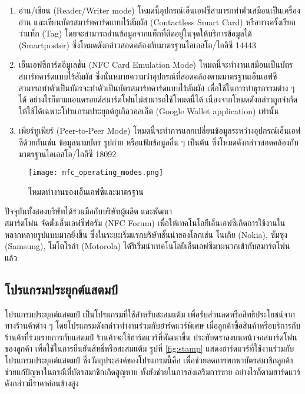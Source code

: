 \documentclass[12pt,a4paper,twocolumn]{article}
\begin{document}
\begin{enumerate}
\item อ่าน/เขียน (Reader/Writer mode) โหมดนี้อุปกรณ์เอ็นเอฟซีสามารถทำตัวเสมือนเป็นเครื่องอ่าน และเขียนบัตรสมาร์ทคาร์ดแบบไร้สัมผัส (Contactless Smart Card) หรือบางครั้งเรียกว่าแท็ก (Tag) โดยจะสามารถอ่านข้อมูลจากแท็กที่ติดอยู่ในจุดให้บริการข้อมูลได้ (Smartposter) ซึ่งโหมดดังกล่าวสอดคล้องกับมาตรฐานไอเอสโอ/ไออีซี 14443

\item เอ็นเอฟซีการ์ดอีมูเลชั่น (NFC Card Emulation Mode) โหมดนี้จะทำงานเสมือนเป็นบัตรสมาร์ทคาร์ดแบบไร้สัมผัส ซึ่งนั่นหมายความว่าอุปกรณ์ที่สอดคล้องตามมาตรฐานเอ็นเอฟซี สามารถทำตัวเป็นบัตรจะทำตัวเป็นบัตรสมาร์ทคาร์ดแบบไร้สัมผัส เพื่อใช้ในการทำธุรกรรมต่าง ๆ ได้ อย่างไรก็ตามแอนดรอยด์สมาร์ตโฟนไม่สามารถใช้โหมดนี้ได้ \cite{itm:IDA-Pay} เนื่องจากโหมดดังกล่าวถูกจำกัดให้ใช้ได้เฉพาะโปรแกรมประยุกต์กูเกิลวอลเล็ต (Google Wallet application) เท่านั้น 

\item เพียร์ทูเพียร์ (Peer-to-Peer Mode) โหมดนี้จะทำการแลกเปลี่ยนข้อมูลระหว่างอุปกรณ์เอ็นเอฟซีด้วยกันเช่น ข้อมูลนามบัตร รูปถ่าย หรือแฟ้มข้อมูลอื่น ๆ เป็นต้น ซึ่งโหมดดังกล่าวสอดคล้องกับมาตรฐานไอเอสโอ/ไออีซี 18092
\end{enumerate}

\begin{figure}[ht!]
\centering
\texttt{[image: nfc\_operating\_modes.png]}
\caption{โหมดทำงานของเอ็นเอฟซีและมาตรฐาน} \label{fig:nfc}
\label{overflow}
\end{figure}

ปัจจุบันทั้งสองบริษัทได้ร่วมมือกับบริษัทผู้ผลิต และพัฒนา\\สมาร์ตโฟน จัดตั้งเอ็นเอฟซีฟอรัม (NFC Forum) เพื่อให้เทคโนโลยีเอ็นเอฟซีเกิดการใช้งานในหลากหลายรูปแบบมากยิ่งขึ้น ซึ่งในระยะเริ่มแรกบริษัทชั้นนำของโลกเช่น โนเกีย (Nokia), ซัมซุง (Samsung), โมโตโรล่า (Motorola) ได้ริเริ่มนำเทคโนโลยีเอ็นเอฟซีมาผนวกเข้ากับสมาร์ตโฟนแล้ว

\subsection{โปรแกรมประยุกต์แสตมป์}
โปรแกรมประยุกต์แสตมป์ เป็นโปรแกรมที่ใช้สำหรับสะสมแต้ม เพื่อรับส่วนลดหรือสิทธิประโยชน์จากทางร้านค้าต่าง ๆ โดยโปรแกรมดังกล่าวทำงานร่วมกับฮาร์ดแวร์พิเศษ เมื่อลูกค้าซื้อสินค้าหรือบริการกับร้านค้าที่ร่วมรายการกับแสตมป์ ร้านค้าจะใช้ฮาร์ดแวร์ที่พัฒนาขึ้น ประทับตราลงบนหน้าจอสมาร์ตโฟนของลูกค้า เพื่อใช้ในการยืนยันสิทธิ์หรือสะสมแต้ม รูปที่ \ref{fig:stamp} แสดงฮาร์ดแวร์ที่ใช้งานร่วมกับโปรแกรมประยุกต์แสตมป์ ซึ่งวัตถุประสงค์ของโปรแกรมนี้คือ เพื่อช่วยลดการพกพาบัตรสมาชิกลูกค้า ช่วยแก้ปัญหาในกรณีที่บัตรสมาชิกเกิดสูญหาย ทั้งยังช่วยในการส่งเสริมการขาย อย่างไรก็ตามฮาร์ดแวร์ดังกล่าวมีราคาค่อนข้างสูง
\end{document}
